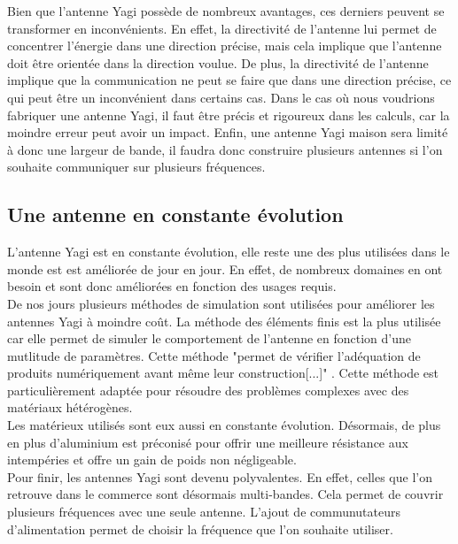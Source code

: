 \documentclass[12pt, a4paper]{article}
\begin{document}
Bien que l'antenne Yagi possède de nombreux avantages, ces derniers
peuvent se transformer en inconvénients. En effet, la directivité de l'antenne
lui permet de concentrer l'énergie dans une direction
précise, mais cela implique que l'antenne doit être
orientée dans la direction voulue. De plus, la directivité
de l'antenne implique que la communication ne peut se faire
que dans une direction précise, ce qui peut être un inconvénient
dans certains cas. Dans le cas où nous voudrions fabriquer
une antenne Yagi, il faut être précis et rigoureux dans
les calculs, car la moindre erreur peut avoir un impact. 
Enfin, une antenne Yagi maison sera limité à donc une
largeur de bande, il faudra donc construire plusieurs antennes
si l'on souhaite communiquer sur plusieurs fréquences.\\

\subsection{Une antenne en constante évolution}
L'antenne Yagi est en constante évolution, elle reste 
une des plus utilisées dans le monde est 
est améliorée de jour en jour. En effet, de nombreux 
domaines en ont besoin et sont donc améliorées en
fonction des usages requis.\\

De nos jours plusieurs méthodes de simulation
sont utilisées pour améliorer les antennes Yagi à moindre
coût. La méthode des éléments finis est la plus utilisée
car elle permet de simuler le comportement de l'antenne
en fonction d'une mutlitude de paramètres. Cette méthode 
"permet de vérifier l'adéquation de produits 
numériquement avant même leur construction[...]" \cite{r3}.
Cette méthode est particulièrement adaptée pour 
résoudre des problèmes complexes avec des matériaux 
hétérogènes.\\

Les matérieux utilisés sont eux aussi en constante 
évolution. Désormais, de plus en plus d'aluminium 
est préconisé pour offrir une meilleure résistance 
aux intempéries et offre un gain de poids non négligeable.\\

Pour finir, les antennes Yagi sont devenu polyvalentes.
En effet, celles que l'on retrouve dans le commerce
sont désormais multi-bandes. Cela permet de couvrir
plusieurs fréquences avec une seule antenne. L'ajout
de communutateurs d'alimentation permet de choisir
la fréquence que l'on souhaite utiliser.\\
\end{document}
